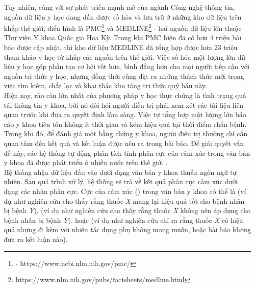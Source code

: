 Tuy nhiên, cùng với sự phát triển mạnh mẽ của ngành Công nghệ thông tin, nguồn dữ liệu y học đang dần được số hóa và lưu trữ ở những kho dữ liệu trên khắp thế giới, điển hình là PMC\footnote{ - https://www.ncbi.nlm.nih.gov/pmc/} và MEDLINE\footnote{https://www.nlm.nih.gov/pubs/factsheets/medline.html} - hai nguồn dữ liệu lớn thuộc Thư viện Y khoa Quốc gia Hoa Kỳ. Trong khi PMC hiện đã có hơn 4 triệu bài báo được cập nhật, thì kho dữ liệu MEDLINE đã tổng hợp được hơn 23 triệu tham khảo y học từ khắp các nguồn trên thế giới. Việc số hóa một lượng lớn dữ liệu y học góp phần tạo cơ hội tốt hơn, bình đẳng hơn cho mọi người tiếp cận với nguồn tri thức y học, nhưng đồng thời cũng đặt ra những thách thức mới trong việc tìm kiếm, chắt lọc và khai thác kho tàng tri thức quý báu này.\\

Hiện nay, rào cản lớn nhất của phương pháp y học thực chứng là tình trạng quá tải thông tin y khoa, bởi nó đòi hỏi người điều trị phải xem xét các tài liệu liên quan trước khi đưa ra quyết định lâm sàng. Việc tự tổng hợp một lượng lớn báo cáo y khoa tiêu tốn không ít thời gian và kém hiệu quả tại thời điểm chẩn bệnh. Trong khi đó, để đánh giá một bằng chứng y khoa, người điều trị thường chỉ cần quan tâm đến kết quả và kết luận được nêu ra trong bài báo. Để giải quyết vấn đề này, các hệ thống tự động phân tích tính phân cực của cảm xúc trong văn bản y khoa đã được phát triển ở nhiều nước trên thế giới \cite{medhat2014sentiment}.\\

Hệ thống nhận dữ liệu đầu vào dưới dạng văn bản y khoa thuần ngôn ngữ tự nhiên. Sau quá trình xử lý, hệ thống sẽ trả về kết quả phân cực cảm xúc dưới dạng các nhãn phân cực. Cực của cảm xúc () trong văn bản y khoa có thể là \tichcuc (ví dụ như nghiên cứu cho thấy rằng thuốc \textit{X} mang lại hiệu quả tốt cho bệnh nhân bị bệnh \textit{Y}), \tieucuc (ví dụ như nghiên cứu cho thấy rằng thuốc \textit{X} không nên áp dụng cho bệnh nhân bị bệnh \textit{Y}), hoặc \trungtinh (ví dụ như nghiên cứu chỉ ra rằng thuốc \textit{X} có hiệu quả nhưng đi kèm với nhiều tác dụng phụ không mong muốn, hoặc bài báo không đưa ra kết luận nào).\\

